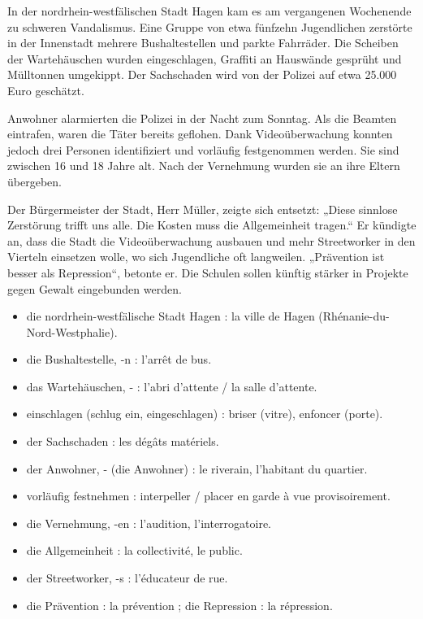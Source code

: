 \documentclass[11pt]{article}
\newcommand{\cle}[1]{{\popxbold\color{popdark}#1}}
\begin{document}
\begin{textebox}
In der nordrhein-westfälischen Stadt Hagen kam es am vergangenen Wochenende zu schweren Vandalismus. Eine Gruppe von etwa fünfzehn Jugendlichen zerstörte in der Innenstadt mehrere Bushaltestellen und parkte Fahrräder. Die Scheiben der Wartehäuschen wurden eingeschlagen, Graffiti an Hauswände gesprüht und Mülltonnen umgekippt. Der Sachschaden wird von der Polizei auf etwa 25.000 Euro geschätzt.

Anwohner alarmierten die Polizei in der Nacht zum Sonntag. Als die Beamten eintrafen, waren die Täter bereits geflohen. Dank Videoüberwachung konnten jedoch drei Personen identifiziert und vorläufig festgenommen werden. Sie sind zwischen 16 und 18 Jahre alt. Nach der Vernehmung wurden sie an ihre Eltern übergeben.

Der Bürgermeister der Stadt, Herr Müller, zeigte sich entsetzt: „Diese sinnlose Zerstörung trifft uns alle. Die Kosten muss die Allgemeinheit tragen.“ Er kündigte an, dass die Stadt die Videoüberwachung ausbauen und mehr Streetworker in den Vierteln einsetzen wolle, wo sich Jugendliche oft langweilen. „Prävention ist besser als Repression“, betonte er. Die Schulen sollen künftig stärker in Projekte gegen Gewalt eingebunden werden.
\end{textebox}

\begin{definition}
\begin{itemize}
    \item \cle{die nordrhein-westfälische Stadt Hagen} : la ville de Hagen (Rhénanie-du-Nord-Westphalie).
    \item \cle{die Bushaltestelle, -n} : l'arrêt de bus.
    \item \cle{das Wartehäuschen, -} : l'abri d'attente / la salle d'attente.
    \item \cle{einschlagen (schlug ein, eingeschlagen)} : briser (vitre), enfoncer (porte).
    \item \cle{der Sachschaden} : les dégâts matériels.
    \item \cle{der Anwohner, - (die Anwohner)} : le riverain, l'habitant du quartier.
    \item \cle{vorläufig festnehmen} : interpeller / placer en garde à vue provisoirement.
    \item \cle{die Vernehmung, -en} : l'audition, l'interrogatoire.
    \item \cle{die Allgemeinheit} : la collectivité, le public.
    \item \cle{der Streetworker, -s} : l'éducateur de rue.
    \item \cle{die Prävention} : la prévention ; \cle{die Repression} : la répression.
\end{itemize}
\end{definition}
\end{document}
